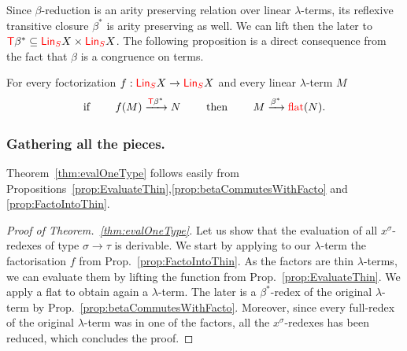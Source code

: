 Since $\beta$-reduction is an arity preserving relation  over linear $\lambda$-terms, its reflexive transitive closure $\beta^*$ is arity preserving as well.  We can lift then the later to ${\color{red}{\mathsf T}} \beta^*\subseteq {\color{red}{\mathsf{Lin}_{S}}} X\times{\color{red}{\mathsf{Lin}_{S}}} X$.
The following proposition is a direct consequence from the fact that $\beta$ is a congruence on terms.

\begin{proposition}\label{prop:betaCommutesWithFacto}
For every foctorization $f:{\color{red}{\mathsf{Lin}_{S}}} X \to {\color{red}{\mathsf{Lin}_{S}}} X$ and every linear $\lambda$-term $M$
$$\text{if }\qquad f(M) \xrightarrow{{\color{red}{\mathsf T}} \beta^*} N \qquad\text{ then }\qquad M\xrightarrow{\beta^*} {\color{red}{\mathrm{flat}}}(N).$$
\end{proposition}


\subsubsection{Gathering all the pieces.}
Theorem~\ref{thm:evalOneType} follows easily from Propositions~\ref{prop:EvaluateThin},\ref{prop:betaCommutesWithFacto} and \ref{prop:FactoIntoThin}.

\begin{proof}[Proof of Theorem.~\ref{thm:evalOneType}]
Let us show that the evaluation of all  $x^\sigma$-redexes of type $\sigma\rightarrow\tau$ is derivable. We start by applying to our $\lambda$-term the factorisation $f$ from Prop.~\ref{prop:FactoIntoThin}. As the factors are thin $\lambda$-terms, we can evaluate them by lifting the function from Prop.~\ref{prop:EvaluateThin}. We apply a flat to obtain again a $\lambda$-term. The later is a $\beta^*$-redex of the original $\lambda$-term by Prop.~\ref{prop:betaCommutesWithFacto}. Moreover, since every full-redex of the original $\lambda$-term was in one of the factors, all the $x^\sigma$-redexes has been reduced, which concludes the proof. 
\end{proof}